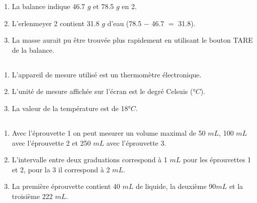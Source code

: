 \documentclass[12pt,a4paper]{article}
\begin{document}
\begin{enumerate}[label=\alph*)]
	\item La balance indique \num{46.7} $g$ et \num{78.5} $g$ en 2.
	\item L'erlenmeyer 2 contient \num{31.8} $g$ d'eau (\num{78.5} $-$ \num{46.7} $=$ \num{31.8}).
	\item La masse aurait pu être trouvée plus rapidement en utilisant le bouton TARE de la balance.
\end{enumerate}

\subsection*{}

\begin{enumerate}[label=\alph*)]
	\item L'appareil de mesure utilisé est un thermomètre électronique.
	\item L'unité de mesure affichée sur l'écran est le degré Celsuis (°$C$).
	\item La valeur de la température est de \num{18}°$C$.
\end{enumerate}

\subsection*{}

\begin{enumerate}[label=\alph*)]
	\item Avec l'éprouvette 1 on peut mesurer un volume maximal de 50 $mL$, 100 $mL$ avec l'éprouvette 2 et 250 $mL$ avec l'éprouvette 3.
	\item L'intervalle entre deux graduations correspond à 1 $mL$ pour les éprouvettes 1 et 2, pour la 3 il correspond à 2 $mL$.
	\item La première éprouvette contient 40 $mL$ de liquide, la deuxième 90$mL$ et la troisième 222 $mL$.
\end{enumerate}

\subsection*{}

\end{document}

